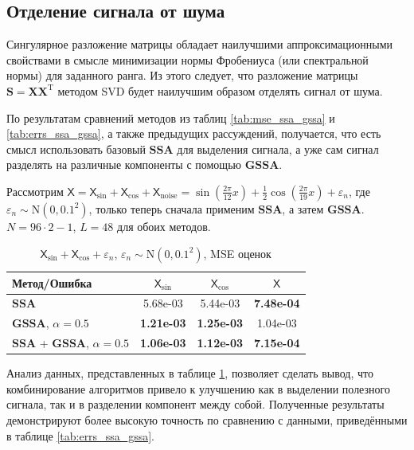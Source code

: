 \documentclass[a4paper, 11pt]{article}
\newcommand{\SSA}{\textbf{SSA}}
\newcommand{\GSSA}{\textbf{GSSA}}
\newcommand{\TS}{\mathsf{X}}
\begin{document}
\subsection{Отделение сигнала от шума}


Сингулярное разложение матрицы обладает наилучшими аппроксимационными свойствами в смысле минимизации нормы Фробениуса (или спектральной нормы) для заданного ранга. Из этого следует, что разложение матрицы $\mathbf{S} = \mathbf{X}\mathbf{X}^{\mathrm{T}}$ методом SVD будет наилучшим образом отделять сигнал от шума.

По результатам сравнений методов из таблиц \ref{tab:mse_ssa_gssa} и \ref{tab:errs_ssa_gssa}, а также предыдущих рассуждений, получается, что есть смысл использовать базовый $\SSA$ для выделения сигнала, а уже сам сигнал разделять на различные компоненты с помощью $\GSSA$.

Рассмотрим $\TS = \TS_{\sin} + \TS_{\cos} + \TS_{\mathrm{noise}} =
	\sin\left(\frac{2\pi}{12}x\right) +
	\frac{1}{2}\cos\left(\frac{2\pi}{19}x\right)+
	\varepsilon_n$,
где $\varepsilon_n \sim \mathrm N(0, 0.1^2)$, только теперь сначала применим $\SSA$, а затем $\GSSA$.
$N = 96 \cdot 2 - 1$, $L = 48$ для обоих методов.

\begin{table}[H]
	\centering
	\caption{$\TS_{\sin} + \TS_{\cos}+
			\varepsilon_n$, $\varepsilon_n \sim \mathrm N(0, 0.1^2)$, MSE оценок }
	\label{tab:errs_ssa_gssa_unite}
	\begin{tabular}{l|ccc}
		\hline
		Метод/Ошибка                     & $\TS_{\sin}$      & $\TS_{\cos}$      & $\TS$             \\
		\hline
		$\SSA$                           & 5.68e-03          & 5.44e-03          & \textbf{7.48e-04} \\
		$\GSSA$, $\alpha = 0.5$          & \textbf{1.21e-03} & \textbf{1.25e-03} & 1.04e-03          \\
		\hline
		$\SSA$ + $\GSSA$, $\alpha = 0.5$ & \textbf{1.06e-03} & \textbf{1.12e-03} & \textbf{7.15e-04} \\
		\hline
	\end{tabular}
\end{table}

Анализ данных, представленных в таблице \ref{tab:errs_ssa_gssa_unite}, позволяет сделать вывод, что комбинирование алгоритмов привело к улучшению как в выделении полезного сигнала, так и в разделении компонент между собой. Полученные результаты демонстрируют более высокую точность по сравнению с данными, приведёнными в таблице \ref{tab:errs_ssa_gssa}.
\end{document}
